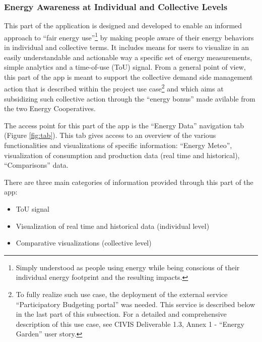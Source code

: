\subsubsection{Energy Awareness at Individual and Collective Levels}
\label{sec:energydata}

This part of the application is designed and developed to enable an informed approach to ``fair energy use''\footnote{Simply understood as people using energy while
being conscious of their individual energy footprint and the resulting impacts.} by making people aware of their
energy behaviors in individual and collective terms.
%
It includes means for users to visualize in an easily
understandable and actionable way a specific set of energy measurements, simple analytics and a time-of-use (ToU) signal.
From a general point of view, this part of the app is meant to support the collective demand side management
action that is described within the project use case\footnote{To fully realize such use case, the deployment of the external service ``Participatory Budgeting portal''
was needed. This service is described below in the last part of this subsection.
For a detailed and comprehensive description of this use case, see CIVIS Deliverable 1.3, Annex 1 - ``Energy Garden'' user story.}
and which aims at subsidizing such collective action through the ``energy bonus'' made avilable from the two Energy Cooperatives.

The access point for this part of the app is the ``Energy Data'' navigation tab (Figure \ref{fig:tab}). This tab gives access to an
overview of the various functionalities and visualizations of specific information: ``Energy Meteo'', visualization of consumption and production data (real time and historical),
``Comparisons'' data.

There are three main categories of information provided through this part of the app:
\begin{itemize}
 \item ToU signal
 \item Visualization of real time and historical data (individual level)
 \item Comparative visualizations (collective level)
\end{itemize}


